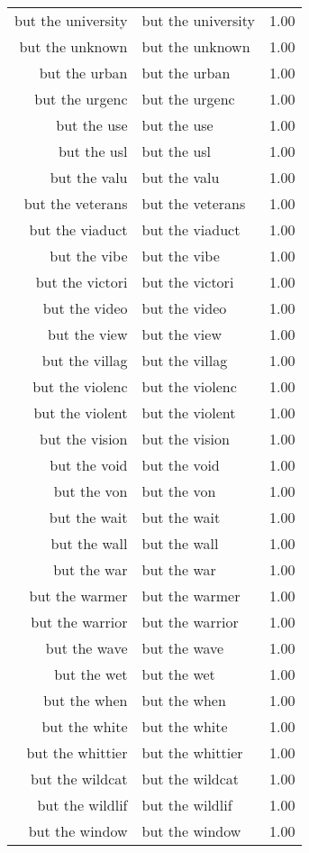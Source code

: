\begin{table}[ht]
\begin{tabular}{rlr}
  but the university & but the university & 1.00 \\ 
  but the unknown & but the unknown & 1.00 \\ 
  but the urban & but the urban & 1.00 \\ 
  but the urgenc & but the urgenc & 1.00 \\ 
  but the use & but the use & 1.00 \\ 
  but the usl & but the usl & 1.00 \\ 
  but the valu & but the valu & 1.00 \\ 
  but the veterans & but the veterans & 1.00 \\ 
  but the viaduct & but the viaduct & 1.00 \\ 
  but the vibe & but the vibe & 1.00 \\ 
  but the victori & but the victori & 1.00 \\ 
  but the video & but the video & 1.00 \\ 
  but the view & but the view & 1.00 \\ 
  but the villag & but the villag & 1.00 \\ 
  but the violenc & but the violenc & 1.00 \\ 
  but the violent & but the violent & 1.00 \\ 
  but the vision & but the vision & 1.00 \\ 
  but the void & but the void & 1.00 \\ 
  but the von & but the von & 1.00 \\ 
  but the wait & but the wait & 1.00 \\ 
  but the wall & but the wall & 1.00 \\ 
  but the war & but the war & 1.00 \\ 
  but the warmer & but the warmer & 1.00 \\ 
  but the warrior & but the warrior & 1.00 \\ 
  but the wave & but the wave & 1.00 \\ 
  but the wet & but the wet & 1.00 \\ 
  but the when & but the when & 1.00 \\ 
  but the white & but the white & 1.00 \\ 
  but the whittier & but the whittier & 1.00 \\ 
  but the wildcat & but the wildcat & 1.00 \\ 
  but the wildlif & but the wildlif & 1.00 \\ 
  but the window & but the window & 1.00 \\ 

\end{tabular}
\end{table}

